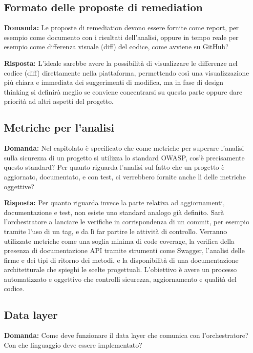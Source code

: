 \documentclass[a4paper,12pt]{article}
\begin{document}
{    \subsection{Formato delle proposte di remediation}
    \textbf{Domanda:} Le proposte di remediation devono essere fornite come report, per esempio come documento con i risultati dell'analisi, oppure in tempo reale per esempio come differenza visuale (diff) del codice, come avviene su GitHub?

    \textbf{Risposta:} L'ideale sarebbe avere la possibilità di visualizzare le differenze nel codice (diff) direttamente nella piattaforma, permettendo così una visualizzazione più chiara e immediata dei suggerimenti di modifica, ma in fase di design thinking si definirà meglio se conviene concentrarsi su questa parte oppure dare priorità ad altri aspetti del progetto.

    \subsection{Metriche per l'analisi}
    \textbf{Domanda:} Nel capitolato è specificato che come metriche per superare l'analisi sulla sicurezza di un progetto si utilizza lo standard OWASP, cos'è precisamente questo standard? Per quanto riguarda l'analisi sul fatto che un progetto è aggiornato, documentato, e con test, ci verrebbero fornite anche lì delle metriche oggettive?

    \textbf{Risposta:} Per quanto riguarda invece la parte relativa ad aggiornamenti, documentazione e test, non esiste uno standard analogo già definito. Sarà l'orchestratore a lanciare le verifiche in corrispondenza di un commit, per esempio tramite l'uso di un tag, e da lì far partire le attività di controllo. Verranno utilizzate metriche come una soglia minima di code coverage, la verifica della presenza di documentazione API tramite strumenti come Swagger, l'analisi delle firme e dei tipi di ritorno dei metodi, e la disponibilità di una documentazione architetturale che spieghi le scelte progettuali. L'obiettivo è avere un processo automatizzato e oggettivo che controlli sicurezza, aggiornamento e qualità del codice.

    \subsection{Data layer}
    \textbf{Domanda:} Come deve funzionare il data layer che comunica con l'orchestratore? Con che linguaggio deve essere implementato?

}
\end{document}
